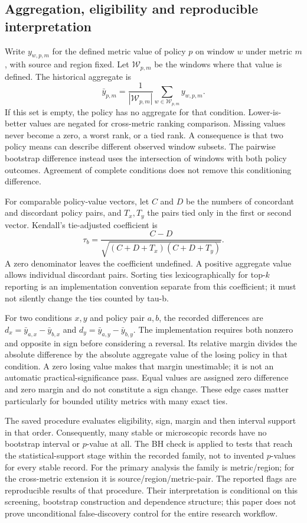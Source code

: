 \subsection{Aggregation, eligibility and reproducible interpretation}
Write $y_{w,p,m}$ for the defined metric value of policy $p$ on window $w$
under metric $m$, with source and region fixed. Let
$\mathcal W_{p,m}$ be the windows where that value is defined. The
historical aggregate is
\begin{equation}
 \bar y_{p,m}=\frac{1}{|\mathcal W_{p,m}|}
       \sum_{w\in\mathcal W_{p,m}} y_{w,p,m}.
\end{equation}
If this set is empty, the policy has no aggregate for that condition.
Lower-is-better values are negated for cross-metric ranking comparison.
Missing values never become a zero, a worst rank, or a tied rank. A
consequence is that two policy means can describe different observed
window subsets. The pairwise bootstrap difference instead uses the
intersection of windows with both policy outcomes. Agreement of complete
conditions does not remove this conditioning difference.

For comparable policy-value vectors, let $C$ and $D$ be the numbers of
concordant and discordant policy pairs, and $T_x,T_y$ the pairs tied only
in the first or second vector. Kendall's tie-adjusted coefficient is
\begin{equation}
 \tau_b=\frac{C-D}{\sqrt{(C+D+T_x)(C+D+T_y)}}.
\end{equation}
A zero denominator leaves the coefficient undefined. A positive aggregate
value allows individual discordant pairs. Sorting ties lexicographically
for top-$k$ reporting is an implementation convention separate from this
coefficient; it must not silently change the ties counted by tau-b.

For two conditions $x,y$ and policy pair $a,b$, the recorded differences
are $d_x=\bar y_{a,x}-\bar y_{b,x}$ and $d_y=\bar y_{a,y}-\bar y_{b,y}$.
The implementation requires both nonzero and opposite in sign before
considering a reversal. Its relative margin divides the absolute
difference by the absolute aggregate value of the losing policy in that
condition. A zero losing value makes that margin unestimable; it is not
an automatic practical-significance pass. Equal values are assigned zero
difference and zero margin and do not constitute a sign change. These
edge cases matter particularly for bounded utility metrics with many
exact ties.

The saved procedure evaluates eligibility, sign, margin and then interval
support in that order. Consequently, many stable or microscopic records
have no bootstrap interval or $p$-value at all. The BH check is applied to
tests that reach the statistical-support stage within the recorded family,
not to invented $p$-values for every stable record. For the primary
analysis the family is metric/region; for the cross-metric extension it
is source/region/metric-pair. The reported flags are reproducible results
of that procedure. Their interpretation is conditional on this screening,
bootstrap construction and dependence structure; this paper does not prove
unconditional false-discovery control for the entire research workflow.

